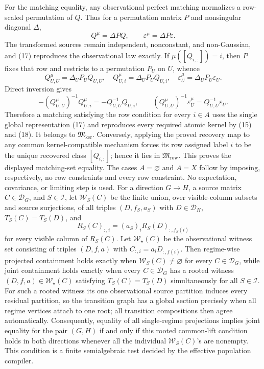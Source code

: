 For the matching equality, any observational perfect matching normalizes a row-scaled permutation of \(Q\). Thus for a permutation matrix \(P\) and nonsingular diagonal \(\Delta\),
\[
Q^\mu=\Delta P Q,
\qquad \varepsilon^\mu=\Delta P\varepsilon. \tag{17}
\]
The transformed sources remain independent, nonconstant, and non-Gaussian, and (17) reproduces the observational law exactly. If \(\mu([Q_{i,:}])=i\), then \(P\) fixes that row and restricts to a permutation \(P_U\) on \(U\), whence
\[
Q^\mu_{U,U}=\Delta_UP_UQ_{U,U},\quad
Q^\mu_{U,i}=\Delta_UP_UQ_{U,i},\quad
\varepsilon^\mu_U=\Delta_UP_U\varepsilon_U.
\]
Direct inversion gives
\[
-(Q^\mu_{U,U})^{-1}Q^\mu_{U,i}=-Q_{U,U}^{-1}Q_{U,i},
\qquad
(Q^\mu_{U,U})^{-1}\varepsilon^\mu_U=Q_{U,U}^{-1}\varepsilon_U. \tag{18}
\]
Therefore a matching satisfying the row condition for every \(i\in A\) uses the single global representation (17) and reproduces every required atomic kernel by (15) and (18). It belongs to \(\mathfrak M_{\mathrm{ker}}\). Conversely, applying the proved recovery map to any common kernel-compatible mechanism forces its row assigned label \(i\) to be the unique recovered class \([Q_{i,:}]\); hence it lies in \(\mathfrak M_{\mathrm{row}}\). This proves the displayed matching-set equality. The cases \(A=\varnothing\) and \(A=X\) follow by imposing, respectively, no row constraints and every row constraint. No expectation, covariance, or limiting step is used.
For a direction \(G\to H\), a source matrix \(C\in\mathcal D_G\), and \(S\in\mathcal I\), let \(\mathcal W_S(C)\) be the finite union, over visible-column subsets and source surjections, of all triples \((D,f_S,a_S)\) with \(D\in\mathcal D_H\), \(T_S(C)=T_S(D)\), and
\[
R_S(C)_{:,i}=(a_S)_iR_S(D)_{:,f_S(i)}
\]
for every visible column of \(R_S(C)\). Let \(\mathcal W_\star(C)\) be the observational witness set consisting of triples \((D,f,a)\) with \(C_{:,i}=a_iD_{:,f(i)}\). Then regime-wise projected containment holds exactly when \(\mathcal W_S(C)\ne\varnothing\) for every \(C\in\mathcal D_G\), while joint containment holds exactly when every \(C\in\mathcal D_G\) has a rooted witness \((D,f,a)\in\mathcal W_\star(C)\) satisfying \(T_S(C)=T_S(D)\) simultaneously for all \(S\in\mathcal I\). For such a rooted witness its one observational source partition induces every residual partition, so the transition graph has a global section precisely when all regime vertices attach to one root; all transition compositions then agree automatically. Consequently, equality of all single-regime projections implies joint equality for the pair \((G,H)\) if and only if this rooted common-lift condition holds in both directions whenever all the individual \(\mathcal W_S(C)\)'s are nonempty. This condition is a finite semialgebraic test decided by the effective population compiler.
